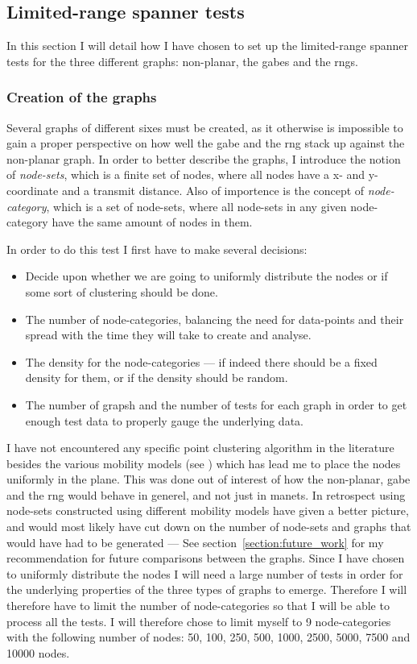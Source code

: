 \subsection{Limited-range spanner tests}
\label{section:test_desc_spanners}
In this section I will detail how I have chosen to set up the limited-range spanner tests for the three different graphs: non-planar, the \acp{gabe} and the \acp{rng}.

\subsubsection{Creation of the graphs}
Several graphs of different sixes must be created, as it otherwise is impossible to gain a proper perspective on how well the \ac{gabe} and the \ac{rng} stack up against the non-planar graph. In order to better describe the graphs, I introduce the notion of \emph{node-sets}, which is a finite set of nodes, where all nodes have a x- and y-coordinate and a transmit distance. Also of importence is the concept of \emph{node-category}, which is a set of node-sets, where all node-sets in any given node-category have the same amount of nodes in them. 

In order to do this test I first have to make several decisions:
\begin{itemize}
\item Decide upon whether we are going to uniformly distribute the nodes or if some sort of clustering should be done. 
\item The number of node-categories, balancing the need for data-points and their spread with the time they will take to create and analyse.
\item The density for the node-categories --- if indeed there should be a fixed density for them, or if the density should be random.
\item The number of grapsh and the number of tests for each graph in order to get enough test data to properly gauge the underlying data.
\end{itemize}

I have not encountered any specific point clustering algorithm in the literature besides the various mobility models (see \cite{disasterArea, MobilityAdHocResearch}) which has lead me to place the nodes uniformly in the plane. This was done out of interest of how the non-planar, \ac{gabe} and the \ac{rng} would behave in generel, and not just in \acp{manet}. In retrospect using node-sets constructed using different  mobility models have given a better picture, and would most likely have cut down on the number of node-sets and graphs that would have had to be generated --- See section~\ref{section:future_work} for my recommendation for future comparisons between the graphs.   
Since I have chosen to uniformly distribute the nodes I will need a large number of tests in order for the underlying properties of the three types of graphs to emerge. Therefore I will therefore have to limit the number of node-categories so that I will be able to process all the tests. I will therefore chose to limit myself to 9 node-categories with the following number of nodes: 50, 100, 250, 500, 1000, 2500, 5000, 7500 and 10000 nodes.

